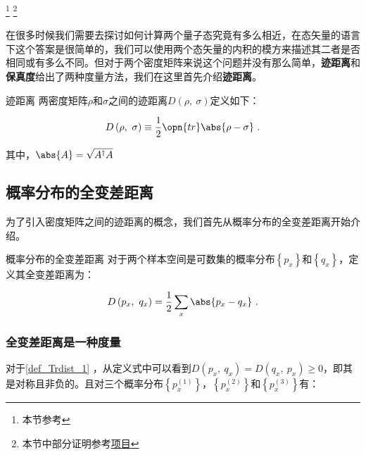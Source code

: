 
\footnote{本节参考\cite{量子信息}}
\footnote{本节中部分证明参考\href{https://github.com/goropikari/SolutionQCQINielsenChuang}{项目}}


在很多时候我们需要去探讨如何计算两个量子态究竟有多么相近，在态矢量的语言下这个答案是很简单的，我们可以使用两个态矢量的内积的模方来描述其二者是否相同或有多么不同。但对于两个密度矩阵来说这个问题并没有那么简单，\textbf{迹距离}和\textbf{保真度}给出了两种度量方法，我们在这里首先介绍\textbf{迹距离}。

\begin{definition}{迹距离}\label{def_Trdist_1}
两密度矩阵$\rho$和$\sigma$之间的迹距离$D\left(\rho,~\sigma\right)$定义如下：

\begin{equation}
D\left(\rho,~\sigma\right) \equiv \frac{1}{2} \opn{tr}\abs{\rho - \sigma}~.
\end{equation}

其中，$\abs{A} = \sqrt{A^\dagger A}$

\end{definition}

\subsection{概率分布的全变差距离}

为了引入密度矩阵之间的迹距离的概念，我们首先从概率分布的全变差距离开始介绍。

\begin{definition}{概率分布的全变差距离}
对于两个样本空间是可数集的概率分布$\left\{ p_x \right\}$和$\left\{q_x\right\}$，定义其全变差距离为：

\begin{equation}\label{eq_Trdist_1}
D\left( p_x,~q_x \right) = \frac{1}{2}\sum_x\abs{p_x - q_x}~.
\end{equation}

\end{definition}

\subsubsection{全变差距离是一种度量}

对于\autoref{def_Trdist_1} ，从定义式中可以看到$D\left(p_x,~q_x\right) = D\left(q_x,~p_x\right)\geqslant 0$，即其是对称且非负的。且对三个概率分布$\left\{p_x^{(1)}\right\}$，$\left\{p_x^{(2)}\right\}$和$\left\{p_x^{(3)}\right\}$有：

